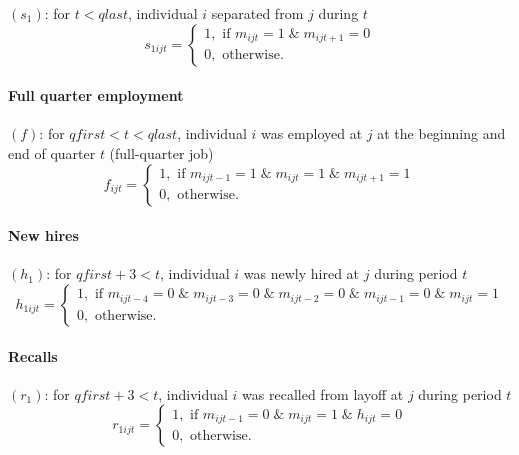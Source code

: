 
$\left( s_{1}\right) $: for $t<qlast$, individual $i$ separated from $j$
during $t$%
\begin{equation}
s_{1ijt}=\left\{ 
\begin{array}{l}
1,\text{ if }m_{ijt}=1\;\&\;m_{ijt+1}=0 \\ 
0,\text{ otherwise.}%
\end{array}%
\right.  \label{eq:s1ijt}
\end{equation}

\paragraph{Full quarter employment}


$\left( f\right) $: for $qfirst<t<qlast$, individual $i$ was employed at $j$
at the beginning and end of quarter $t$ (full-quarter job)%
\begin{equation}
f_{ijt}=\left\{ 
\begin{array}{l}
1,\text{ if }m_{ijt-1}=1\;\&\;m_{ijt}=1\;\&\;m_{ijt+1}=1 \\ 
0,\text{ otherwise.}%
\end{array}%
\right.  \label{eq:fijt}
\end{equation}

\paragraph{New hires}


$\left( h_{1}\right) $: for $qfirst+3<t$, individual $i$ was newly hired at $%
j$ during period $t$%
\begin{equation}
h_{1ijt}=\left\{ 
\begin{array}{l}
1,\text{ if }m_{ijt-4}=0\;\&\;m_{ijt-3}=0\;\&\;m_{ijt-2}=0\;\&\;m_{ijt-1}=0%
\;\&\;m_{ijt}=1 \\ 
0,\text{ otherwise.}%
\end{array}%
\right.  \label{eq:h1ijt}
\end{equation}

\paragraph{Recalls}


$\left( r_{1}\right) $: for $qfirst+3<t$, individual $i$ was recalled from
layoff at $j$ during period $t$%
\begin{equation}
r_{1ijt}=\left\{ 
\begin{array}{l}
1,\text{ if }m_{ijt-1}=0\;\&\;m_{ijt}=1\;\&\;h_{ijt}=0 \\ 
0,\text{ otherwise.}%
\end{array}%
\right.  \label{eq:r1ijt}
\end{equation}

